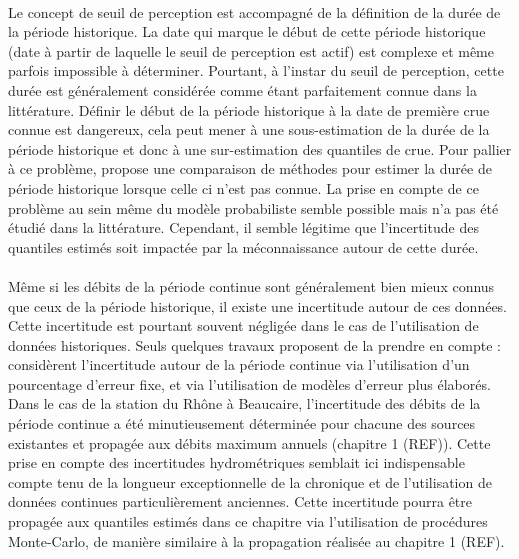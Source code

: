 	\paragraph{} Le concept de seuil de perception est accompagné de la définition de la durée de la période historique. La date qui marque le début de cette période historique (date à partir de laquelle le seuil de perception est actif) est complexe et même parfois impossible à déterminer. Pourtant, à l'instar du seuil de perception, cette durée est généralement considérée comme étant parfaitement connue dans la littérature. Définir le début de la période historique à la date de première crue connue est dangereux, cela peut mener à une sous-estimation de la durée de la période historique et donc à une sur-estimation des quantiles de crue. Pour pallier à ce problème, \citet{prosdocimi_german_2018} propose une comparaison de méthodes pour estimer la durée de période historique lorsque celle ci n'est pas connue. La prise en compte de ce problème au sein même du modèle probabiliste semble possible mais n'a pas été étudié dans la littérature. Cependant, il semble légitime que l'incertitude des quantiles estimés soit impactée par la méconnaissance autour de cette durée. 
	
	\paragraph{} Même si les débits de la période continue sont généralement bien mieux connus que ceux de la période historique, il existe une incertitude autour de ces données. Cette incertitude est pourtant souvent négligée dans le cas de l'utilisation de données historiques. Seuls quelques travaux proposent de la prendre en compte : \citet{parkes_defining_2016} considèrent l'incertitude autour de la période continue via l'utilisation d'un pourcentage d'erreur fixe, et \citet{neppel_flood_2010} via l'utilisation de modèles d'erreur plus élaborés. Dans le cas de la station du Rhône à Beaucaire, l'incertitude des débits de la période continue a été minutieusement déterminée pour chacune des sources existantes et propagée aux débits maximum annuels (chapitre 1 (REF)). Cette prise en compte des incertitudes hydrométriques semblait ici indispensable compte tenu de la longueur exceptionnelle de la chronique et de l'utilisation de données continues particulièrement anciennes. Cette incertitude pourra être propagée aux quantiles estimés dans ce chapitre via l'utilisation de procédures Monte-Carlo, de manière similaire à la propagation réalisée au chapitre 1 (REF).
	
